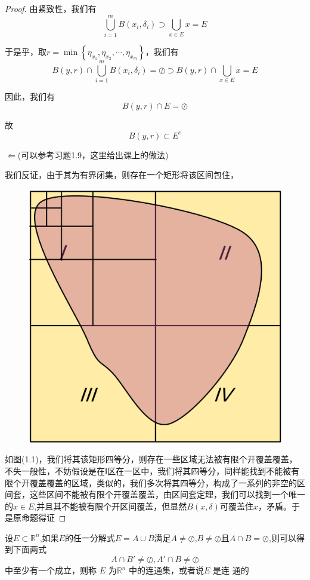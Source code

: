 \documentclass[lang=cn,10pt]{elegantbook}
\begin{document}
\begin{proof}
	由紧致性，我们有
	\begin{equation*}
		\bigcup_{i=1}^m{B\left( x_i,\delta _i \right)}\supset \bigcup_{x\in E}{x}=E
	\end{equation*}
	
	于是乎，取$r=\min \left\{ \eta _{x_1},\eta _{x_2},\cdots ,\eta _{x_m} \right\} $，我们有
	\begin{equation*}
		B\left( y,r \right) \cap \bigcup_{i=1}^m{B\left( x_i,\delta _i \right)}=\oslash \supset B\left( y,r \right) \cap \bigcup_{x\in E}{x}=E
	\end{equation*}
	
	因此，我们有
	\begin{equation*}
		B\left( y,r \right) \cap E=\oslash
	\end{equation*}
	
	故
	\begin{equation*}
		B\left( y,r \right) \subset E^{c}
	\end{equation*}
	
	$\Leftarrow$(可以参考习题1.9，这里给出课上的做法)
	
	我们反证，由于其为有界闭集，则存在一个矩形将该区间包住，
\begin{figure}[H]
	\centering
	\includegraphics[width=0.2\linewidth]{Untitled}
	\caption{}
	\label{fig:untitled}
\end{figure}

如图(1.1)，我们将其该矩形四等分，则存在一些区域无法被有限个开覆盖覆盖，不失一般性，不妨假设是在Ⅰ区在一区中，我们将其四等分，同样能找到不能被有限个开覆盖覆盖的区域，类似的，我们多次将其四等分，构成了一系列的非空的区间套，这些区间不能被有限个开覆盖覆盖，由区间套定理，我们可以找到一个唯一的$x\in E$,并且其不能被有限个开区间覆盖，但显然$B(x,\delta)$可覆盖住$x$，矛盾。于是原命题得证
\end{proof}
\begin{definition}
	$\text{设}E\subset \mathbb{R} ^n$,如果$E $的任一分解式$ E =A\cup B$满足$A\ne \oslash$,$B\ne\oslash$且$A\cap B= \oslash $,则可以得到下面两式
	\begin{equation*}
		A\cap B'\ne \oslash ,A'\cap B\ne \oslash 
	\end{equation*}
	中至少有一个成立，则称 $E$ 为$ \mathbb{R} ^n$ 中的连通集，或者说$ E$ 是连
	通的
\end{definition}
\end{document}
